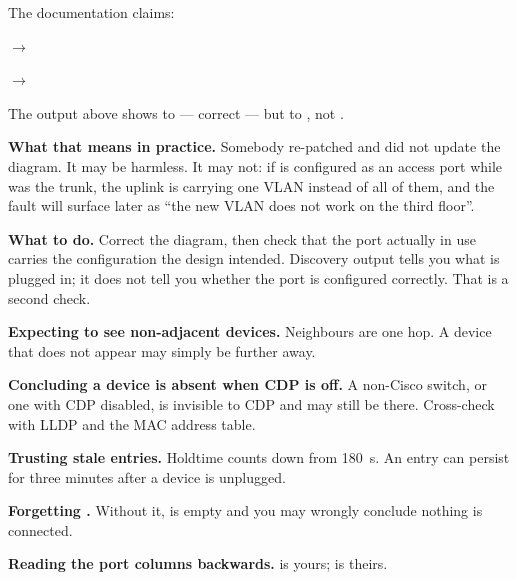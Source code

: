 \begin{worked}
The documentation claims:

\begin{tight}
  \item {} $\rightarrow$ 
  \item {} $\rightarrow$ 
\end{tight}

The output above shows  to  --- correct --- but
 to , not .

\textbf{What that means in practice.} Somebody re-patched  and did not
update the diagram. It may be harmless. It may not: if  is
configured as an access port while  was the trunk, the uplink is
carrying one VLAN instead of all of them, and the fault will surface later as
``the new VLAN does not work on the third floor''.

\textbf{What to do.} Correct the diagram, then check that the port actually in use
carries the configuration the design intended. Discovery output tells you what is
plugged in; it does not tell you whether the port is configured correctly. That
is a second check.
\end{worked}

\begin{pitfall}
\begin{tight}
  \item \textbf{Expecting to see non-adjacent devices.} Neighbours are one hop.
        A device that does not appear may simply be further away.
  \item \textbf{Concluding a device is absent when CDP is off.} A non-Cisco
        switch, or one with CDP disabled, is invisible to CDP and may still be
        there. Cross-check with LLDP and the MAC address table.
  \item \textbf{Trusting stale entries.} Holdtime counts down from 180~s. An
        entry can persist for three minutes after a device is unplugged.
  \item \textbf{Forgetting .} Without it, 
        is empty and you may wrongly conclude nothing is connected.
  \item \textbf{Reading the port columns backwards.}  is
        yours;  is theirs.
\end{tight}
\end{pitfall}

